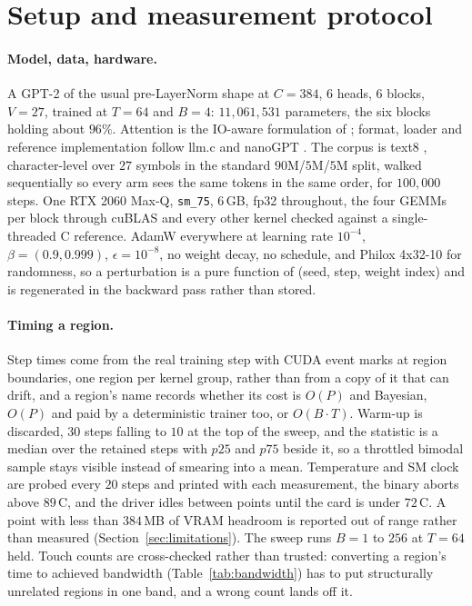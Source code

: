 \section{Setup and measurement protocol}
\label{sec:setup}


\paragraph{Model, data, hardware.}
A GPT-2 \citep{radford2019language} of the usual pre-LayerNorm shape
\citep{vaswani2017attention} at $C = 384$, $6$ heads, $6$ blocks, $V = 27$, trained at
$T = 64$ and $B = 4$: $11{,}061{,}531$ parameters, the six blocks holding about $96\%$.
Attention is the IO-aware formulation of \citet{dao2022flashattention}; format, loader
and reference implementation follow llm.c \citep{karpathy2024llmc} and nanoGPT
\citep{karpathy2022nanogpt}. The corpus is text8 \citep{mahoney2011text8},
character-level over $27$ symbols in the standard $90$M/$5$M/$5$M split, walked
sequentially so every arm sees the same tokens in the same order, for $100{,}000$
steps. One RTX 2060 Max-Q, \texttt{sm\_75}, $6$\,GB, fp32 throughout, the four GEMMs
per block through cuBLAS and every other kernel checked against a single-threaded C
reference. AdamW \citep{kingma2015adam,loshchilov2019adamw} everywhere at learning rate
$10^{-4}$, $\beta = (0.9, 0.999)$, $\epsilon = 10^{-8}$, no weight decay, no schedule,
and Philox 4x32-10 \citep{salmon2011parallel} for randomness, so a perturbation is a
pure function of (seed, step, weight index) and is regenerated in the backward pass
rather than stored.

\paragraph{Timing a region.}
Step times come from the real training step with CUDA event marks at region
boundaries, one region per kernel group, rather than from a copy of it that can drift,
and a region's name records whether its cost is $O(P)$ and Bayesian, $O(P)$ and paid by
a deterministic trainer too, or $O(B \cdot T)$. Warm-up is discarded, $30$ steps
falling to $10$ at the top of the sweep, and the statistic is a median over the
retained steps with $p25$ and $p75$ beside it, so a throttled bimodal sample stays
visible instead of smearing into a mean. Temperature and SM clock are probed
every $20$ steps and printed with each measurement, the binary aborts above
$89$\,\textdegree C, and the driver idles between points until the card is under
$72$\,\textdegree C. A point with less than $384$\,MB of VRAM headroom is reported out
of range rather than measured (Section~\ref{sec:limitations}). The sweep runs $B = 1$
to $256$ at $T = 64$ held. Touch counts are cross-checked rather than trusted:
converting a region's time to achieved bandwidth (Table~\ref{tab:bandwidth}) has to put
structurally unrelated regions in one band, and a wrong count lands off it.

